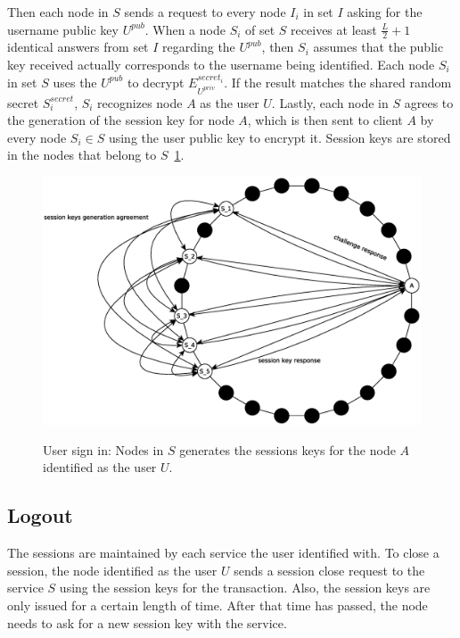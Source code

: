 Then each node in $S$ sends a request to every node $I_i$ in set $I$ asking for the username public key $U^{pub}$. When a node
$S_i$ of set $S$ receives at least $\frac{L}{2} + 1$ identical answers from
set $I$ regarding the $U^{pub}$, then $S_i$ assumes that the public key received
actually corresponds to the username being identified. Each node $S_i$ in set $S$
uses the $U^{pub}$ to decrypt $E^{secret_i}_{U^{priv}}$. If the result matches
the shared random secret $S^{secret}_i$, $S_i$ recognizes node $A$ as the
user $U$.
Lastly, each node in $S$ agrees to the generation of the session key for 
node $A$, which is then sent to client $A$ by every node $S_i \in S$ using
the user public key to encrypt it. Session keys are stored in the
nodes that belong to $S$~\ref{fig:sign_in_3}.

\begin{figure}[!htb]
\centering
\includegraphics[width=14cm]{../img/sign_in_3}\\
\caption{User sign in: Nodes in $S$ generates the sessions keys for the node
$A$ identified as the user $U$.}
\label{fig:sign_in_3}
\end{figure}

\subsection{Logout}
The sessions are maintained by each service the user identified with. To close a
session, the node identified as the user $U$ sends a session close request to
the service $S$ using the session keys for the transaction. Also, the session
keys are only issued for a certain length of time. After that time has passed, the node needs
to ask for a new session key with the service.


